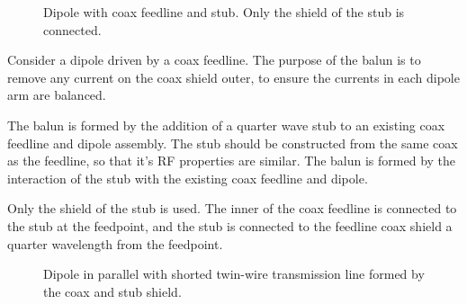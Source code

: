 \documentclass{article}
\begin{document}
\begin{figure}[h]

\caption{Dipole with coax feedline and stub.  Only the shield of the stub is connected.}
\label{fig:assembly}
\vspace{5mm}
\centering
{}
\end{figure}

Consider a dipole driven by a coax feedline.  The purpose of the balun is to remove any current on the coax shield outer, to ensure the currents in each dipole arm are balanced.

The balun is formed by the addition of a quarter wave stub to an existing coax feedline and dipole assembly.  The stub should be constructed from the same coax as the feedline, so that it's RF properties are similar.  The balun is formed by the interaction of the stub with the existing coax feedline and dipole.

Only the shield of the stub is used.  The inner of the coax feedline is connected to the stub at the feedpoint, and the stub is connected to the feedline coax shield a quarter wavelength from the feedpoint.

\begin{figure}[h]
\caption{Dipole in parallel with shorted twin-wire transmission line formed by the coax and stub shield.}
\label{fig:shorted}
\vspace{5mm}
\centering
{}
\end{figure}
\end{document}
